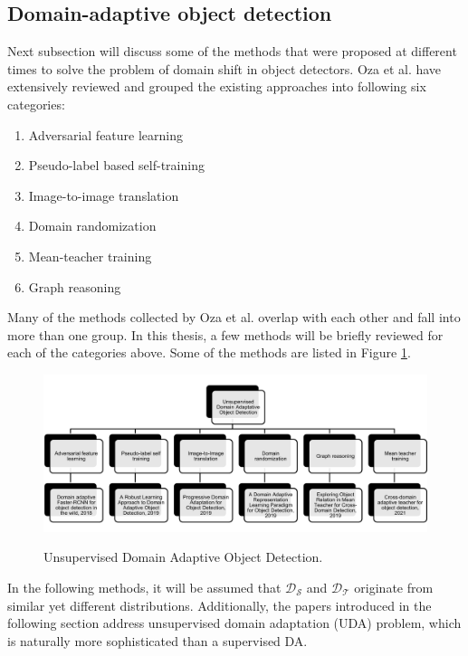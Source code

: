 \subsection{Domain-adaptive object detection}
\label{DAobj} 
Next subsection will discuss some of the methods that were proposed at different times to solve the problem of domain shift in object detectors. Oza et al.  \cite{Oza2021} have extensively reviewed and grouped the existing approaches into following six categories:
\begin{enumerate}
	\item Adversarial feature learning
	\item Pseudo-label based self-training
	\item Image-to-image translation
	\item Domain randomization 
	\item Mean-teacher training
	\item Graph reasoning
\end{enumerate} 

Many of the methods collected by Oza et al. overlap with each other and fall into more than one group. In this thesis, a few methods will be briefly reviewed for each of the categories above. Some of the methods are listed in Figure \ref{UDA_OD}.

\begin{figure}[htb]
	\begin{center}
		\includegraphics[width=16cm]{./UDA_OD.png}
	\end{center}
	\caption{Unsupervised Domain Adaptive Object Detection.}
	\begin{center}
		\label{UDA_OD}
	\end{center}
\end{figure}

In the following methods, it will be assumed that $\mathcal{D_S}$ and $\mathcal{D_T}$ originate from similar yet different distributions. Additionally, the papers introduced in the following section address unsupervised domain adaptation (UDA) problem, which is naturally more sophisticated than a supervised DA.
\FloatBarrier

